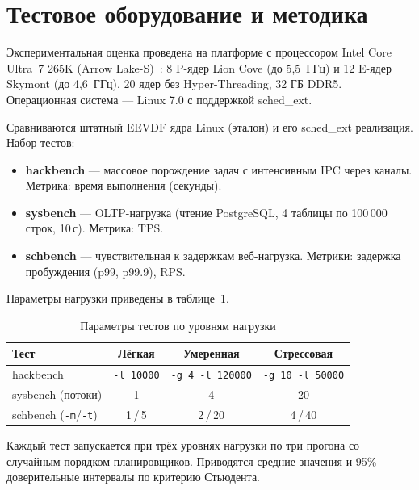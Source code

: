\documentclass[12pt, oneside]{book}
\newenvironment{customquote}
{\list{}{\leftmargin=0.5cm
                \rightmargin=0.5cm
                \topsep=0pt
                \partopsep=0pt
                \parsep=2pt
                \itemsep=0pt
        }%
        \normalfont\relax
\item\relax}
{\endlist}
\begin{document}
\section{Тестовое оборудование и методика}
\begin{customquote}
        \quad Экспериментальная оценка проведена на платформе
        с процессором Intel Core Ultra~7 265K
        (Arrow Lake-S)~\cite{intelhybrid}: 8 P-ядер
        Lion Cove (до 5,5~ГГц) и 12 E-ядер Skymont
        (до 4,6~ГГц), 20 ядер без Hyper-Threading,
        32 ГБ DDR5. Операционная
        система --- Linux 7.0 с поддержкой sched\_ext.

        \quad Сравниваются штатный EEVDF ядра Linux
        (эталон) и его sched\_ext реализация.
        Набор тестов:
        \begin{itemize}
                \item \textbf{hackbench} --- массовое порождение
                        задач с интенсивным IPC через каналы.
                        Метрика: время выполнения (секунды).
                \item \textbf{sysbench} --- OLTP-нагрузка
                        (чтение PostgreSQL, 4 таблицы по
                        100\,000 строк, 10\,с).
                        Метрика: TPS.
                \item \textbf{schbench} --- чувствительная к задержкам
                        веб-нагрузка. Метрики: задержка
                        пробуждения (p99, p99.9), RPS.
        \end{itemize}

        \quad Параметры нагрузки приведены в
        таблице~\ref{tab:params}.

        \begin{table}[!ht]
                \centering
                \caption{Параметры тестов по уровням нагрузки}
                \label{tab:params}
                \vspace{0.3em}
                \begin{tabular}{|l|c|c|c|}
                        \hline
                        Тест & Лёгкая & Умеренная & Стрессовая \\
                        \hline
                        hackbench & \texttt{-l 10000}
                                  & \texttt{-g 4 -l 120000}
                                  & \texttt{-g 10 -l 50000} \\
                        sysbench (потоки) & 1 & 4 & 20 \\
                        schbench (\texttt{-m}/\texttt{-t})
                                  & 1\,/\,5 & 2\,/\,20
                                  & 4\,/\,40 \\
                        \hline
                \end{tabular}
        \end{table}

        \quad Каждый тест запускается при трёх уровнях
        нагрузки по три прогона со случайным порядком
        планировщиков. Приводятся средние значения и
        95\%-доверительные интервалы по критерию Стьюдента.
\end{customquote}
\end{document}

